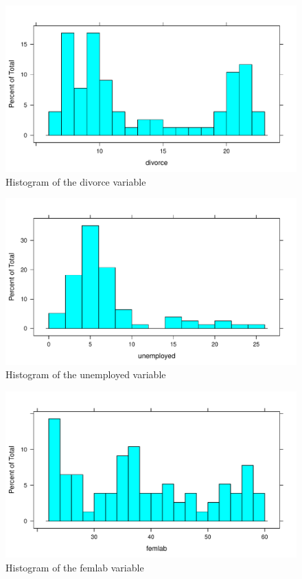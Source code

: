 \documentclass{article}\usepackage[]{graphicx}\usepackage[]{color}
\makeatletter
\def\maxwidth{ %
  \ifdim\Gin@nat@width>\linewidth
    \linewidth
  \else
    \Gin@nat@width
  \fi
}
\newenvironment{knitrout}{}{} %
\makeatother
\begin{document}
\begin{knitrout}
\color{fgcolor}\begin{figure}
\includegraphics[width=\maxwidth]{figure/histograms-1} \caption[Histogram of the divorce variable]{Histogram of the divorce variable}\label{fig:histograms1}
\end{figure}

\begin{figure}
\includegraphics[width=\maxwidth]{figure/histograms-2} \caption[Histogram of the unemployed variable]{Histogram of the unemployed variable}\label{fig:histograms2}
\end{figure}

\begin{figure}
\includegraphics[width=\maxwidth]{figure/histograms-3} \caption[Histogram of the femlab variable]{Histogram of the femlab variable}\label{fig:histograms3}
\end{figure}


\end{knitrout}
\end{document}
